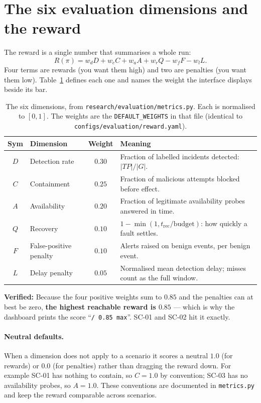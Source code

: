 \documentclass[11pt]{article}
\newcommand{\code}[1]{\texttt{\small #1}}
\newcommand{\file}[1]{\textcolor{mfpurple}{\texttt{\small #1}}}
\newcommand{\keyfact}[1]{%
  \par\vspace{4pt}\noindent
  \colorbox{panel}{\parbox{\dimexpr\linewidth-2\fboxsep}{\small\textbf{\textcolor{mfcyan}{Verified:}} #1}}%
  \par\vspace{4pt}}
\begin{document}
\section{The six evaluation dimensions and the reward}
\label{sec:metrics}

The reward is a single number that summarises a whole run:
\begin{equation}
R(\pi) = w_d D + w_c C + w_a A + w_r Q - w_f F - w_l L .
\label{eq:reward}
\end{equation}
Four terms are rewards (you want them high) and two are penalties (you want them
low). Table~\ref{tab:dims} defines each one and names the weight the interface
displays beside its bar.

\begin{table}[h]
\centering
\caption{The six dimensions, from \file{research/evaluation/metrics.py}. Each is
normalised to $[0,1]$. The weights are the \code{DEFAULT\_WEIGHTS} in that file
(identical to \file{configs/evaluation/reward.yaml}).}
\label{tab:dims}
\small
\begin{tabular}{c p{3.2cm} c p{6.7cm}}
\toprule
\textbf{Sym} & \textbf{Dimension} & \textbf{Weight} & \textbf{Meaning}\\
\midrule
$D$ & Detection rate & $0.30$ & Fraction of labelled incidents detected: $|TP|/|G|$.\\
$C$ & Containment & $0.25$ & Fraction of malicious attempts blocked before effect.\\
$A$ & Availability & $0.20$ & Fraction of legitimate availability probes answered in time.\\
$Q$ & Recovery & $0.10$ & $1-\min(1,t_\text{rec}/\text{budget})$: how quickly a fault settles.\\
$F$ & False-positive penalty & $0.10$ & Alerts raised on benign events, per benign event.\\
$L$ & Delay penalty & $0.05$ & Normalised mean detection delay; misses count as the full window.\\
\bottomrule
\end{tabular}
\end{table}

\keyfact{Because the four positive weights sum to $0.85$ and the penalties can at
best be zero, \textbf{the highest reachable reward is $0.85$} --- which is why the
dashboard prints the score ``\code{/ 0.85 max}''. SC-01 and SC-02 hit it exactly.}

\paragraph{Neutral defaults.} When a dimension does not apply to a scenario it
scores a neutral $1.0$ (for rewards) or $0.0$ (for penalties) rather than dragging
the reward down. For example SC-01 has nothing to contain, so $C=1.0$ by
convention; SC-03 has no availability probes, so $A=1.0$. These conventions are
documented in \file{metrics.py} and keep the reward comparable across scenarios.
\end{document}

